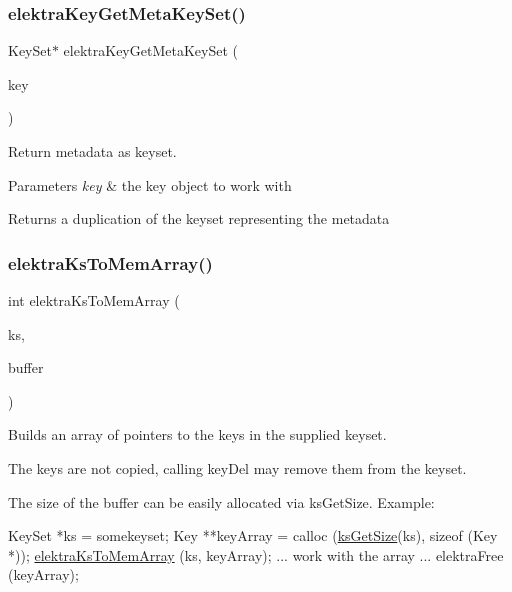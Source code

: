 \subsubsection{\texorpdfstring{elektra\+Key\+Get\+Meta\+Key\+Set()}{elektraKeyGetMetaKeySet()}}
{\footnotesize\ttfamily Key\+Set$\ast$ elektra\+Key\+Get\+Meta\+Key\+Set (\begin{DoxyParamCaption}\item[{const Key $\ast$}]{key }\end{DoxyParamCaption})}



Return metadata as keyset. 


\begin{DoxyParams}{Parameters}
{\em key} & the key object to work with\\
\hline
\end{DoxyParams}
\begin{DoxyReturn}{Returns}
a duplication of the keyset representing the metadata 
\end{DoxyReturn}
\mbox{\label{group__api_gac3e995819383f904369c260f212125f5}} 
\subsubsection{\texorpdfstring{elektra\+Ks\+To\+Mem\+Array()}{elektraKsToMemArray()}}
{\footnotesize\ttfamily int elektra\+Ks\+To\+Mem\+Array (\begin{DoxyParamCaption}\item[{Key\+Set $\ast$}]{ks,  }\item[{Key $\ast$$\ast$}]{buffer }\end{DoxyParamCaption})}



Builds an array of pointers to the keys in the supplied keyset. 

The keys are not copied, calling key\+Del may remove them from the keyset.

The size of the buffer can be easily allocated via ks\+Get\+Size. Example\+: 
\begin{DoxyCode}
KeySet *ks = somekeyset;
Key **keyArray = calloc (\hyperlink{group__keyset_ga7474ad6b0a0fa969dbdf267ba5770eee}{ksGetSize}(ks), \textcolor{keyword}{sizeof} (Key *));
\hyperlink{group__api_gac3e995819383f904369c260f212125f5}{elektraKsToMemArray} (ks, keyArray);
... work with the array ...
elektraFree (keyArray);
\end{DoxyCode}




